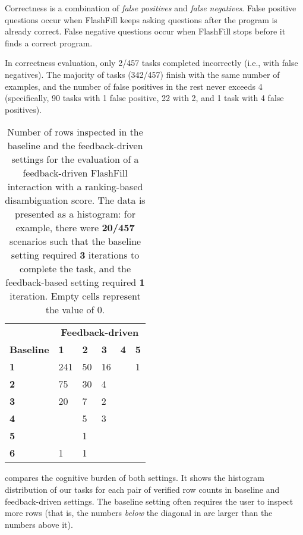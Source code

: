 Correctness is a combination of \emph{false positives} and \emph{false negatives}.
False positive questions occur when FlashFill keeps asking questions after the program is already correct.
False negative questions occur when FlashFill stops before it finds a correct program.

In correctness evaluation, only 2/457 tasks completed incorrectly (i.e., with false negatives).
The majority of tasks (342/457) finish with the same number of examples, and the number of false positives in the rest
never exceeds 4 (specifically, 90 tasks with 1 false positive, 22 with 2, and 1 task with 4 false positives).

\begin{table}[t]
    \centering
    \begin{tabular}{llllll}
        \toprule
        & \multicolumn{5}{c}{\textbf{Feedback-driven}} \\
        \cmidrule{2-6}
        \textbf{Baseline} & \textbf{1} & \textbf{2} & \textbf{3} & \textbf{4} & \textbf{5} \\
        \midrule
        \textbf{1} & 241 & 50 & 16 &   & 1 \\
        \textbf{2} & 75 & 30 & 4 &   &   \\
        \textbf{3} & 20 & 7 & 2 &   &   \\
        \textbf{4} &   & 5 & 3 &   &   \\
        \textbf{5} &   & 1 &   &   &   \\
        \textbf{6} & 1 & 1 &   &   &   \\
        \bottomrule
    \end{tabular}
    \caption{Number of rows inspected in the baseline and the feedback-driven settings for the evaluation of
        a feedback-driven FlashFill interaction with a ranking-based disambiguation score.
        The data is presented as a histogram: for example, there were \textbf{20/457} scenarios such that the baseline
        setting required \textbf{3} iterations to complete the task, and the feedback-based setting required \textbf{1}
        iteration.
        Empty cells represent the value of $0$.}
    \label{tbl:feedback:ff:iterations}
\end{table}

 compares the cognitive burden of both settings.
It shows the histogram distribution of our tasks for each pair of verified row counts in baseline and feedback-driven
settings.
The baseline setting often requires the user to inspect more rows (that is, the numbers \emph{below} the diagonal in
 are larger than the numbers above it).
